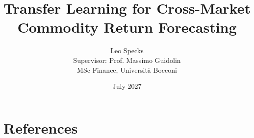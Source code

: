 

\newif\iffastcompile
%

\title{\vspace*{6cm}\textsf{\textbf{Transfer Learning for Cross-Market Commodity Return Forecasting}}}
\author{Leo Specks \\ Supervisor: Prof. Massimo Guidolin\\ MSc Finance, Università Bocconi}
\date{July 2027}



\iffastcompile
\else
  \maketitle
  \thispagestyle{firstpage}
  \setcounter{page}{0}

  


  \newpage

  {
    \hypersetup{linkcolor=black}
    \tableofcontents
  }

\fi



%








\iffastcompile
\else
  \section*{References}
  \nocite{*}

  \printbibliography[
    category=cited,
    heading=none
  ]

  \printbibliography[
    notcategory=cited,
    heading=none
  ]


  \newpage

  \listofacronyms

  
\fi


